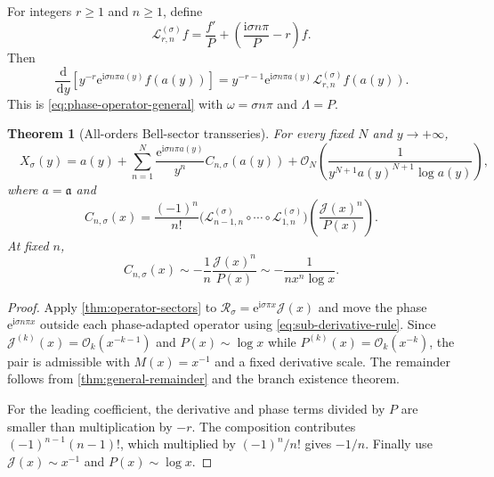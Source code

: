 \documentclass[11pt,a4paper]{article}
\numberwithin{equation}{section}
\newtheorem{theorem}{Theorem}[section]
\theoremstyle{definition}
\theoremstyle{remark}
\newcommand{\e}{\mathrm e}
\newcommand{\ii}{\mathrm i}
\newcommand{\dd}{\,\mathrm d}
\newcommand{\Ord}{\mathcal O}
\newcommand{\Tail}{\mathcal J}
\newcommand{\InvCore}{\mathfrak a}
\newcommand{\Lam}{\Lambda}
\newcommand{\Res}{\mathcal R}
\begin{document}
For integers $r\ge1$ and $n\ge1$, define
\begin{equation}\label{eq:L-rn-sigma}
 \mathcal L^{(\sigma)}_{r,n}f
 =\frac{f'}{P}
 +\left(\frac{\ii\sigma n\pi}{P}-r\right)f.
\end{equation}
Then
\begin{equation}\label{eq:sub-derivative-rule}
 \frac{\dd}{\dd y}
 \left[y^{-r}\e^{\ii\sigma n\pi a(y)}f(a(y))\right]
 =y^{-r-1}\e^{\ii\sigma n\pi a(y)}
 \mathcal L^{(\sigma)}_{r,n}f(a(y)).
\end{equation}
This is \eqref{eq:phase-operator-general} with $\omega=\sigma n\pi$ and
$\Lam=P$.

\begin{theorem}[All-orders Bell-sector transseries]
\label{thm:sub-all-orders}
For every fixed $N$ and $y\to+\infty$,
\begin{equation}\label{eq:sub-all-orders}
 \boxed{\quad
 X_\sigma(y)=a(y)+\sum_{n=1}^{N}
 \frac{\e^{\ii\sigma n\pi a(y)}}{y^n}C_{n,\sigma}(a(y))
 +\Ord_N\!\left(\frac1{y^{N+1}a(y)^{N+1}\log a(y)}\right),
 \quad}
\end{equation}
where $a=\InvCore$ and
\begin{equation}\label{eq:Cn-sigma}
 \boxed{\quad
 C_{n,\sigma}(x)=\frac{(-1)^n}{n!}
 \bigl(\mathcal L^{(\sigma)}_{n-1,n}\circ\cdots\circ
       \mathcal L^{(\sigma)}_{1,n}\bigr)
 \left(\frac{\Tail(x)^n}{P(x)}\right).
 \quad}
\end{equation}
At fixed $n$,
\begin{equation}\label{eq:Cn-leading}
 C_{n,\sigma}(x)
 \sim-\frac1n\frac{\Tail(x)^n}{P(x)}
 \sim-\frac1{n x^n\log x}.
\end{equation}
\end{theorem}

\begin{proof}
Apply \cref{thm:operator-sectors} to
$\Res_\sigma=\e^{\ii\sigma\pi x}\Tail(x)$ and move the phase
$\e^{\ii\sigma n\pi x}$ outside each phase-adapted operator using
\eqref{eq:sub-derivative-rule}.  Since
$\Tail^{(k)}(x)=\Ord_k(x^{-k-1})$ and
$P(x)\sim\log x$ while $P^{(k)}(x)=\Ord_k(x^{-k})$, the pair is admissible
with $M(x)=x^{-1}$ and a fixed derivative scale.  The remainder follows from
\cref{thm:general-remainder} and the branch existence theorem.

For the leading coefficient, the derivative and phase terms divided by
$P$ are smaller than multiplication by $-r$.  The composition contributes
$(-1)^{n-1}(n-1)!$, which multiplied by $(-1)^n/n!$ gives $-1/n$.
Finally use $\Tail(x)\sim x^{-1}$ and $P(x)\sim\log x$.
\end{proof}
\end{document}
